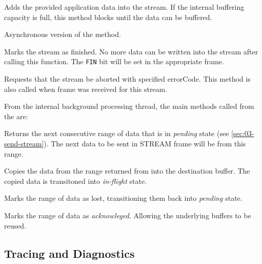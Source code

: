 \begin{description}

   Adds the provided application
data into the stream. If the internal buffering capacity is full, this method blocks until the data
can be buffered.

   Asynchronous
version of the  method.

   Marks the stream as finished. No more data can be
written into the stream after calling this function. The \texttt{FIN} bit will be set in the
appropriate \STREAM{} frame.

   Requests that the stream be aborted
with specified errorCode. This method is also called when \STOPSENDING{} frame was received for this
stream.

\end{description}

From the internal background processing thread, the main methods called from the
\ManagedQuicConnection{} are:

\begin{description}

     Returns the next
consecutive range of data that is in \textit{pending} state (see \autoref{sec:03-send-stream}). The
next data to be sent in STREAM{} frame will be from this range.

     Copies the data from the
range returned from  into the destination buffer. The copied data is
transitoned into \textit{in-flight} state.

     Marks the range of data as
lost, transitioning them back into \textit{pending} state.

     Marks the range
of data as \textit{acknowleged}. Allowing the underlying buffers to be reused.

\end{description}

\subsection{Tracing and Diagnostics}


